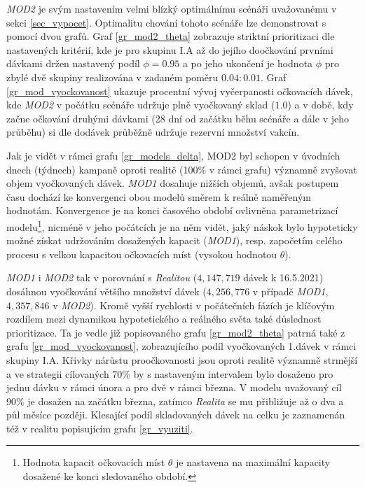 \emph{MOD2} je svým nastavením velmi blízký optimálnímu scénáři uvažovanému v sekci \ref{sec_vypocet}. Optimalitu chování tohoto scénáře lze demonstrovat s pomocí dvou grafů. Graf \ref{gr_mod2_theta} zobrazuje striktní prioritizaci dle nastavených kritérií, kde je pro skupinu I.A až do jejího doočkování prvními dávkami držen nastavený podíl $\phi=0.95$ a po jeho ukončení je hodnota $\phi$ pro zbylé dvě skupiny realizována v zadaném poměru $0.04:0.01$. Graf \ref{gr_mod_vyockovanost} ukazuje procentní vývoj vyčerpanosti očkovacích dávek, kde \emph{MOD2} v počátku scénáře udržuje plně vyočkovaný sklad ($1.0$) a v době, kdy začne očkování druhými dávkami (28 dní od začátku běhu scénáře a dále v jeho průběhu) si dle dodávek průběžně udržuje rezervní množství vakcín.

Jak je vidět v rámci grafu \ref{gr_models_delta}, MOD2 byl schopen v úvodních dnech (týdnech) kampaně oproti realitě (100\% v rámci grafu) významně zvyšovat objem vyočkovaných dávek. \emph{MOD1} dosahuje nižších objemů, avšak postupem času dochází ke konvergenci obou modelů směrem k reálně naměřeným hodnotám. Konvergence je na konci časového období ovlivněna parametrizací modelu\footnote{Hodnota kapacit očkovacích míst $\theta$ je nastavena na maximální kapacity dosažené ke konci sledovaného období.}, nicméně v jeho počátcích je na něm vidět, jaký náskok bylo hypoteticky možné získat udržováním dosažených kapacit (\emph{MOD1}), resp. započetím celého procesu s velkou kapacitou očkovacích míst (vysokou hodnotou $\theta$).

\emph{MOD1} i \emph{MOD2} tak v porovnání s \emph{Realitou} ($4,147,719$ dávek k 16.5.2021) dosáhnou vyočkování většího množství dávek ($4,256,776$ v případě \emph{MOD1}, $4,357,846$ v \emph{MOD2}). Kromě vyšší rychlosti v počátečních fázích je klíčovým rozdílem mezi dynamikou hypotetického a reálného světa také důslednost prioritizace. Ta je vedle již popisovaného grafu \ref{gr_mod2_theta} patrná také z grafu \ref{gr_mod_vyockovanost}, zobrazujícího podíl vyočkovaných 1.dávek v rámci skupiny I.A. Křivky nárůstu proočkovanosti jsou oproti realitě významně strmější a ve strategii cílovaných 70\% by s nastaveným intervalem bylo dosaženo pro jednu dávku v rámci února a pro dvě v rámci března. V modelu uvažovaný cíl 90\% je dosažen na začátku března, zatímco \emph{Realita} se mu přibližuje až o dva a půl měsíce později. Klesající podíl skladovaných dávek na celku je zaznamenán též v realitu popisujícím grafu \ref{gr_vyuziti}.


